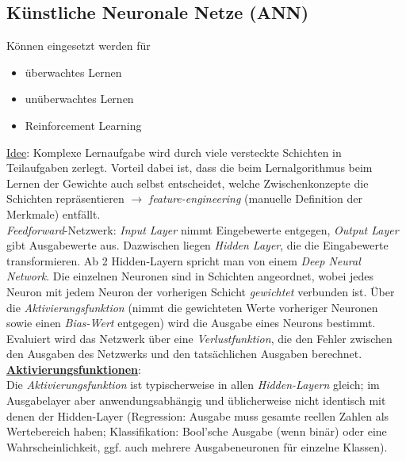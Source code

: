 \subsection{Künstliche Neuronale Netze (ANN)}
\label{ann}
Können eingesetzt werden für 
\begin{itemize}
    \item überwachtes Lernen
    \item unüberwachtes Lernen
    \item Reinforcement Learning
\end{itemize}

\underline{Idee}: Komplexe Lernaufgabe wird durch viele versteckte Schichten in Teilaufgaben zerlegt. Vorteil dabei ist, dass die beim Lernalgorithmus beim Lernen der Gewichte auch selbst entscheidet, welche Zwischenkonzepte die Schichten repräsentieren $\rightarrow$ \emph{feature-engineering} (manuelle Definition der Merkmale) entfällt.\\

\emph{Feedforward}-Netzwerk: \emph{Input Layer} nimmt Eingebewerte entgegen, \emph{Output Layer} gibt Ausgabewerte aus. Dazwischen liegen \emph{Hidden Layer}, die die Eingabewerte transformieren. Ab 2 Hidden-Layern spricht man von einem \emph{Deep Neural Network}. Die einzelnen Neuronen sind in Schichten angeordnet, wobei jedes Neuron mit jedem Neuron der vorherigen Schicht \emph{gewichtet} verbunden ist.
Über die \emph{Aktivierungsfunktion} (nimmt die gewichteten Werte vorheriger Neuronen sowie einen \emph{Bias-Wert} entgegen) wird die Ausgabe eines Neurons bestimmt.
Evaluiert wird das Netzwerk über eine \emph{Verlustfunktion}, die den Fehler zwischen den Ausgaben des Netzwerks und den tatsächlichen Ausgaben berechnet.\\

\underline{\textbf{Aktivierungsfunktionen}}:\\
Die \emph{Aktivierungsfunktion} ist typischerweise in allen \emph{Hidden-Layern} gleich; im Ausgabelayer aber anwendungsabhängig und üblicherweise nicht identisch mit denen der Hidden-Layer (Regression: Ausgabe muss gesamte reellen Zahlen als Wertebereich haben; Klassifikation: Bool'sche Ausgabe (wenn binär) oder eine Wahrscheinlichkeit, ggf. auch mehrere Ausgabeneuronen für einzelne Klassen).

